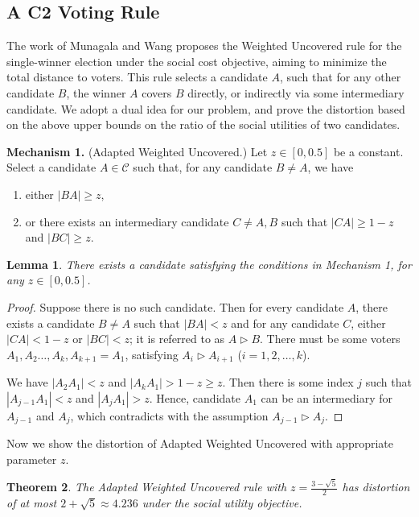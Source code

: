 \documentclass[11pt]{article}
\newtheorem{theorem}{Theorem}[section]
\newtheorem{lemma}[theorem]{Lemma}
\theoremstyle{remark}
\begin{document}
\subsection{A C2 Voting Rule}

The work of Munagala and Wang \cite{munagala2019improved} proposes the Weighted Uncovered rule for the single-winner election under the social cost objective, aiming to minimize the total distance to voters. This rule selects a candidate $A$, such that for any other candidate $B$, the winner $A$ covers $B$ directly, or indirectly via some intermediary candidate. We adopt a dual idea for our problem, and prove the distortion based on the above upper bounds on the ratio of the social utilities of two candidates.

\vspace{2mm}\hspace{-3.5mm}\textbf{Mechanism 1.} {\sc(Adapted Weighted Uncovered.)} Let $z\in [0,0.5]$ be a constant. Select a candidate $A\in \mathcal C$ such that, for any candidate $B\neq A$, we have
 \begin{enumerate}
 \item either $|BA|\ge z$,
 \item or there exists an intermediary candidate $C\ne A,B$ such that $|CA|\ge 1-z$ and $|BC|\ge z$.
 \end{enumerate}

\begin{lemma}\label{lem:non}
 There exists a candidate satisfying the conditions in Mechanism 1, for any $z\in[0,0.5]$. %
 \end{lemma}

\begin{proof}
 Suppose there is no such candidate. Then for every candidate $A$, there exists a candidate $B\ne A$ such that $|BA|<z$ and for any candidate $C$, either $|CA|<1-z$ or $|BC|<z$; it is referred to as $A\rhd B$. There must be some voters $A_1,A_2\ldots,A_k,A_{k+1}=A_1$, satisfying $A_i\rhd A_{i+1}$ ($i=1,2,\ldots,k$).

 We have $|A_2A_1|<z$ and $|A_kA_1|>1-z\ge z$. Then there is some index $j$ such that $|A_{j-1}A_1|<z$ and $|A_jA_1|>z$. Hence, candidate $A_1$ can be an intermediary for $A_{j-1}$ and $A_j$, which contradicts with the assumption $A_{j-1}\rhd A_j$.
 \end{proof}

 Now we show the distortion of Adapted Weighted Uncovered with appropriate parameter $z$.
\begin{theorem}
 The Adapted Weighted Uncovered rule with $z=\frac{3-\sqrt5}{2}$ has distortion of at most $2+\sqrt5\approx 4.236$ under the social utility objective.
 \end{theorem}
\end{document}
